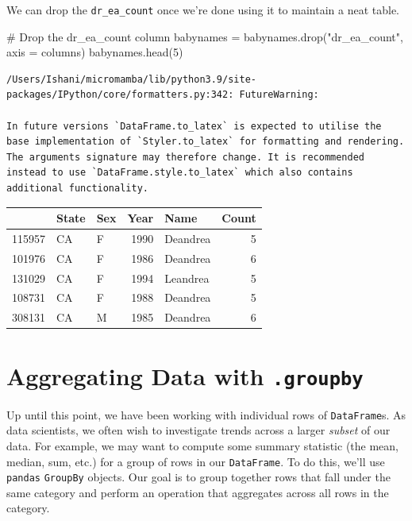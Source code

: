 \documentclass[
  letterpaper,
  DIV=11,
  numbers=noendperiod]{scrreprt}
\newenvironment{Shaded}{\begin{snugshade}}{\end{snugshade}}
\newcommand{\CommentTok}[1]{\textcolor[rgb]{0.37,0.37,0.37}{#1}}
\newcommand{\DecValTok}[1]{\textcolor[rgb]{0.68,0.00,0.00}{#1}}
\newcommand{\NormalTok}[1]{\textcolor[rgb]{0.00,0.23,0.31}{#1}}
\newcommand{\OperatorTok}[1]{\textcolor[rgb]{0.37,0.37,0.37}{#1}}
\newcommand{\StringTok}[1]{\textcolor[rgb]{0.13,0.47,0.30}{#1}}
\begin{document}
We can drop the \texttt{dr\_ea\_count} once we're done using it to
maintain a neat table.

\begin{Shaded}
\begin{Highlighting}[]
\CommentTok{\# Drop the \textasciigrave{}dr\_ea\_count\textasciigrave{} column}
\NormalTok{babynames }\OperatorTok{=}\NormalTok{ babynames.drop(}\StringTok{"dr\_ea\_count"}\NormalTok{, axis }\OperatorTok{=} \StringTok{\textquotesingle{}columns\textquotesingle{}}\NormalTok{)}
\NormalTok{babynames.head(}\DecValTok{5}\NormalTok{)}
\end{Highlighting}
\end{Shaded}

\begin{verbatim}
/Users/Ishani/micromamba/lib/python3.9/site-packages/IPython/core/formatters.py:342: FutureWarning:

In future versions `DataFrame.to_latex` is expected to utilise the base implementation of `Styler.to_latex` for formatting and rendering. The arguments signature may therefore change. It is recommended instead to use `DataFrame.style.to_latex` which also contains additional functionality.
\end{verbatim}

\begin{tabular}{lllrlr}
\toprule
{} & State & Sex &  Year &      Name &  Count \\
\midrule
115957 &    CA &   F &  1990 &  Deandrea &      5 \\
101976 &    CA &   F &  1986 &  Deandrea &      6 \\
131029 &    CA &   F &  1994 &  Leandrea &      5 \\
108731 &    CA &   F &  1988 &  Deandrea &      5 \\
308131 &    CA &   M &  1985 &  Deandrea &      6 \\
\bottomrule
\end{tabular}

\hypertarget{aggregating-data-with-.groupby}{%
\section{\texorpdfstring{Aggregating Data with
\texttt{.groupby}}{Aggregating Data with .groupby}}\label{aggregating-data-with-.groupby}}

Up until this point, we have been working with individual rows of
\texttt{DataFrame}s. As data scientists, we often wish to investigate
trends across a larger \emph{subset} of our data. For example, we may
want to compute some summary statistic (the mean, median, sum, etc.) for
a group of rows in our \texttt{DataFrame}. To do this, we'll use
\texttt{pandas} \texttt{GroupBy} objects. Our goal is to group together
rows that fall under the same category and perform an operation that
aggregates across all rows in the category.
\end{document}
